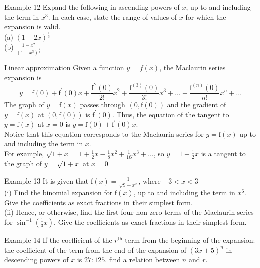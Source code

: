 \documentclass{beamer}
\begin{document}
\begin{frame}{Example 12}
Expand the following in ascending powers of $x$, up to and including the term in $x^3$. In each case, state the range of values of $x$ for which the expansion is valid.\\
(a) $(1-2x)^{\frac{1}{3}}$\\
(b) $\frac{1-x^2}{(1+x^3)^{\frac{1}{3}}}$
\end{frame}

\begin{frame}{Linear approximation}
    Given a function $y=f(x)$, the Maclaurin series expansion is
$$
y=\mathrm{f}(0)+\mathrm{f}^{\prime}(0) x+\frac{\mathrm{f}^{\prime \prime}(0)}{2 !} x^2+\frac{\mathrm{f}^{(3)}(0)}{3 !} x^3+\ldots+\frac{\mathrm{f}^{(n)}(0)}{n !} x^n+\ldots
$$
The graph of $y=\mathrm{f}(x)$ passes through $(0, \mathrm{f}(0))$ and the gradient of $y=\mathrm{f}(x)$ at $(0, \mathrm{f}(0))$ is $\mathrm{f}^{\prime}(0)$. Thus, the equation of the tangent to $y=\mathrm{f}(x)$ at $x=0$ is $y=\mathrm{f}(0)+\mathrm{f}^{\prime}(0) x$.\\
Notice that this equation corresponds to the Maclaurin series for $y=\mathrm{f}(x)$ up to and including the term in $x$.\\
\vspace{\baselineskip}
For example, $\sqrt{1+x}=1+\frac{1}{2} x-\frac{1}{8} x^2+\frac{1}{16} x^3+\ldots$, so $y=1+\frac{1}{2} x$ is a tangent to the graph of $y=\sqrt{1+x}$ at $x=0$
\end{frame}

\begin{frame}{Example 13}
It is given that $\mathrm{f}(x)=\frac{1}{\sqrt{9-x^2}}$, where $-3<x<3$\\
(i) Find the binomial expansion for $\mathrm{f}(x)$, up to and including the term in $x^6$. Give the coefficients as exact fractions in their simplest form.\\
(ii) Hence, or otherwise, find the first four non-zero terms of the Maclaurin series for $\sin ^{-1}\left(\frac{1}{3} x\right)$. Give the coefficients as exact fractions in their simplest form.
\end{frame}

\begin{frame}{Example 14}
If the coefficient of the $r^{\text {th}}$ term from the beginning of the expansion: the coefficient of the term from the end of the expansion of $(3 x+5)^n$ in descending powers of $x$ is $27: 125$. find a relation between $n$ and $r$.
\end{frame}
\end{document}
